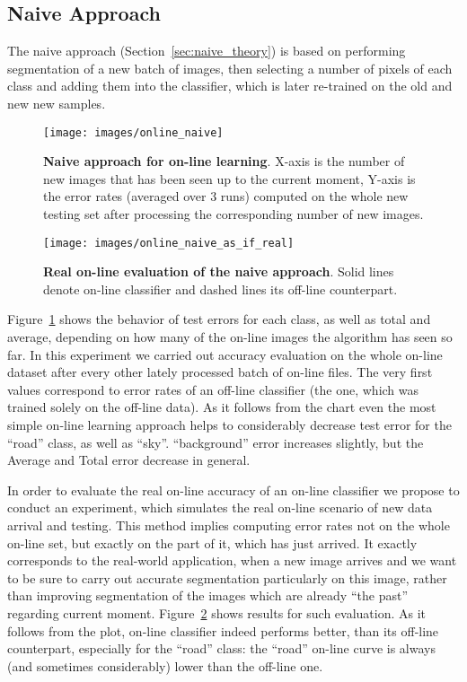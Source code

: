 \subsection{Naive Approach}

The naive approach (Section~\ref{sec:naive_theory}) is based on performing segmentation of a new batch of images, then selecting a 
number of pixels of each class and adding them into the classifier, which is later re-trained on the old and new new samples. 

\begin{figure}[ht]
 \centering
 \texttt{[image: images/online\_naive]}
 \caption[Naive approach for on-line learning]{
 {\bf Naive approach for on-line learning}.
  X-axis is the number of new images that has been seen up to the current moment, Y-axis is the error rates (averaged over 3 runs)
  computed on the whole new testing set after processing the corresponding number of new images.}
 \label{fig:online_naive}
\end{figure}

\begin{figure}[ht]
 \centering
 \texttt{[image: images/online\_naive\_as\_if\_real]}
 \caption[Real on-line evaluation of the naive approach]{
 {\bf Real on-line evaluation of the naive approach}.
 Solid lines denote on-line classifier and dashed lines its off-line counterpart.}
 \label{fig:online_naive_as_if_real}
\end{figure}

Figure~\ref{fig:online_naive} shows the behavior of test errors for each class, as well as total and average, depending on how many of the on-line
images the algorithm has seen so far. In this experiment we carried out accuracy evaluation on the whole on-line dataset after every other lately processed
batch of on-line files. The very first values correspond to error rates of an off-line classifier (\ie the one, which was trained solely
on the off-line data). As it follows from the chart even the most simple on-line learning approach helps to considerably decrease test error for
the ``road'' class, as well as ``sky''. ``background'' error increases slightly, but the Average and Total error decrease in general.

In order to evaluate the real on-line accuracy of an on-line classifier we propose to conduct an experiment, which simulates the real on-line scenario
of new data arrival and testing. This method implies computing error rates not on the whole on-line set, but exactly on the part of it, which has just
arrived. It exactly corresponds to the real-world application, when a new image arrives and we want to be sure to carry out accurate segmentation
particularly on this image, rather than improving segmentation of the images which are already ``the past'' regarding current moment.
Figure~\ref{fig:online_naive_as_if_real} shows results for such evaluation. As it follows from the plot, on-line classifier indeed performs better, than
its off-line counterpart, especially for the ``road'' class: the ``road'' on-line curve is always (and sometimes considerably) lower than the off-line one.

